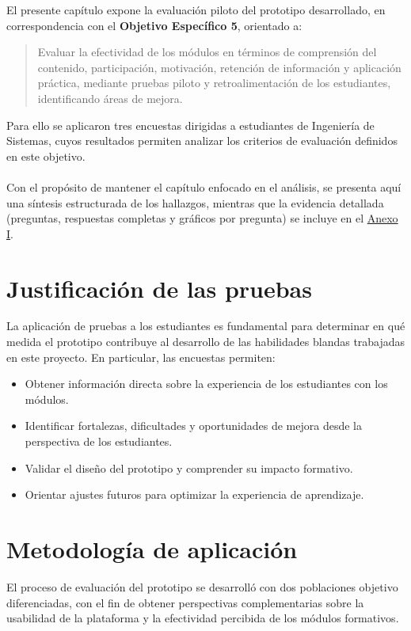 El presente capítulo expone la evaluación piloto del prototipo desarrollado, en correspondencia con el \textbf{Objetivo Específico 5}, orientado a:

\begin{quote}
Evaluar la efectividad de los módulos en términos de comprensión del contenido, participación, motivación, retención de información y aplicación práctica, mediante pruebas piloto y retroalimentación de los estudiantes, identificando áreas de mejora.
\end{quote}

Para ello se aplicaron tres encuestas dirigidas a estudiantes de Ingeniería de Sistemas, cuyos resultados permiten analizar los criterios de evaluación definidos en este objetivo.
\\
\\
Con el propósito de mantener el capítulo enfocado en el análisis, se presenta aquí una síntesis estructurada de los hallazgos, mientras que la evidencia detallada (preguntas, respuestas completas y gráficos por pregunta) se incluye en el \hyperref[anexo:encuestas]{Anexo I}.

\section{Justificación de las pruebas}

La aplicación de pruebas a los estudiantes es fundamental para determinar en qué medida el prototipo contribuye al desarrollo de las habilidades blandas trabajadas en este proyecto. En particular, las encuestas permiten:

\begin{itemize}
    \item Obtener información directa sobre la experiencia de los estudiantes con los módulos.
    \item Identificar fortalezas, dificultades y oportunidades de mejora desde la perspectiva de los estudiantes.
    \item Validar el diseño del prototipo y comprender su impacto formativo.
    \item Orientar ajustes futuros para optimizar la experiencia de aprendizaje.
\end{itemize}

\section{Metodología de aplicación}

El proceso de evaluación del prototipo se desarrolló con dos poblaciones objetivo diferenciadas, con el fin de obtener perspectivas complementarias sobre la usabilidad de la plataforma y la efectividad percibida de los módulos formativos.

